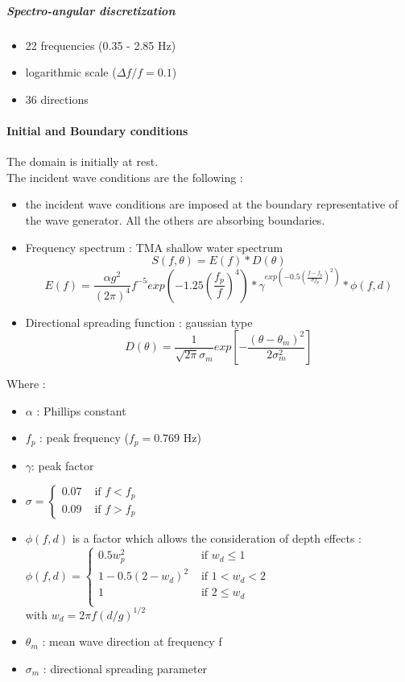 \subparagraph{Spectro-angular discretization}
\begin{itemize}
\item 22 frequencies (0.35 - 2.85 Hz)
\item logarithmic scale ($\Delta f/f = 0.1$)
\item 36 directions
\end{itemize}

\paragraph{Initial and Boundary conditions}
The domain is initially at rest.\\
The incident wave conditions are the following :
\begin{itemize}
\item the incident wave conditions are imposed at the boundary representative of the wave generator. All the others are absorbing boundaries.
\item Frequency spectrum : TMA shallow water spectrum
\[S(f,\theta) = E(f)*D(\theta) \]
\[E(f) = \frac{\alpha g^2}{(2\pi)^4}f^{-5} exp(-1.25(\frac{f_p}{f})^{4})*\gamma^{exp(-0.5(\frac{f-f_p}{\sigma f_p})^{2})}*\phi (f,d)
\]
\item Directional spreading function : gaussian type
\[D(\theta) = \frac{1}{\sqrt{2\pi}\sigma _m}exp[-\frac{(\theta - \theta _m)^2}{2\sigma^2_m}]
\]
\end{itemize}
Where :\\
\begin{itemize}
\item $\alpha$ : Phillips constant
\item $f_p$ : peak frequency ($f_p = 0.769$ Hz)
\item $\gamma $: peak factor
\item $\sigma = \left\{ \begin{array}{rl}
 0.07 &\mbox{ if $f<f_p$} \\
  0.09 &\mbox{ if $f>f_p$}
       \end{array} \right.$
\item $\phi (f,d)$ is a factor which allows the consideration of depth effects :\\
$\phi (f,d) = \left\{ \begin{array}{rl}
 0.5 w^2_p &\mbox{ if $w_d\le 1$} \\
  1-0.5(2-w_d)^2 &\mbox{ if $1<w_d<2$}\\
  1 &\mbox{ if $2 \le w_d$} \\
       \end{array} \right.$\\
       with $w_d = 2\pi f(d/g)^{1/2}$
       \item$\theta _m$ : mean wave direction at frequency f
       \item $\sigma _m$ : directional spreading parameter
\end{itemize}
